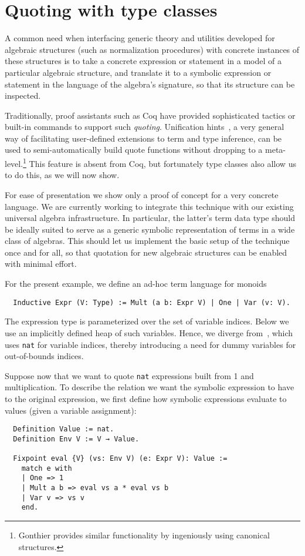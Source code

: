\documentclass[a4paper,10pt,runningheads]{llncs}
\begin{document}
\section{Quoting with type classes}\label{quoting}

A common need when interfacing generic theory and utilities developed for algebraic structures (such as normalization procedures) with concrete instances of these structures is to take a concrete expression or statement in a model of a particular algebraic structure, and translate it to a symbolic expression or statement in the language of the algebra's signature, so that its structure can be inspected.

Traditionally, proof assistants such as Coq have provided sophisticated tactics or built-in commands to support such \emph{quoting}. Unification hints~\cite{Hints}, a very general way of facilitating user-defined extensions to term and type inference, can be used to semi-automatically build quote functions without dropping to a meta-level.\footnote{Gonthier provides similar functionality by ingeniously using canonical structures.} This feature is absent from Coq, but fortunately type classes also allow us to do this, as we will now show.

For ease of presentation we show only a proof of concept for a very concrete language. We are currently working to integrate this technique with our existing universal algebra infrastructure. In particular, the latter's term data type should be ideally suited to serve as a generic symbolic representation of terms in a wide class of algebras. This should let us implement the basic setup of the technique once and for all, so that quotation for new algebraic structures can be enabled with minimal effort.

For the present example, we define an ad-hoc term language for monoids
\begin{lstlisting}
  Inductive Expr (V: Type) := Mult (a b: Expr V) | One | Var (v: V).
\end{lstlisting}
The expression type is parameterized over the set of variable indices. Below we use an implicitly defined heap of such variables. Hence, we diverge from~\cite{Hints}, which uses \lstinline|nat| for variable indices, thereby introducing a need for dummy variables for out-of-bounds indices.

Suppose now that we want to quote \lstinline|nat| expressions built from 1 and multiplication. To describe the relation we want the symbolic expression to have to the original expression, we first define how symbolic expressions evaluate to values (given a variable assignment):
\begin{lstlisting}
  Definition Value := nat.
  Definition Env V := V → Value.

  Fixpoint eval {V} (vs: Env V) (e: Expr V): Value :=
    match e with
    | One => 1
    | Mult a b => eval vs a * eval vs b
    | Var v => vs v
    end.
\end{lstlisting}
\end{document}
